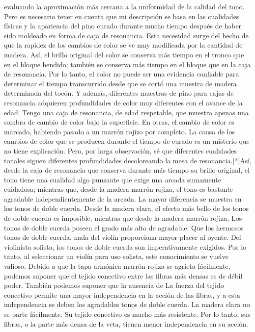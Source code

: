 evaluando la aproximación más cercana a la uniformidad de la calidad del tono. Pero es necesario tener en cuenta que mi descripción se basa en las cualidades físicas y la apariencia del pino curado durante mucho tiempo después de haber sido moldeado en forma de caja de resonancia. Esta necesidad surge del hecho de que la rapidez de los cambios de color se ve muy modificada por la cantidad de madera. Así, el brillo original del color se conserva más tiempo en el tronco que en el bloque hendido; también se conserva más tiempo en el bloque que en la caja de resonancia. Por lo tanto, el color no puede ser una evidencia confiable para determinar el tiempo transcurrido desde que se cortó una muestra de madera determinada del tocón. Y además, diferentes muestras de pino para cajas de resonancia adquieren profundidades de color muy diferentes con el avance de la edad. Tengo una caja de resonancia, de edad respetable, que muestra apenas una sombra de cambio de color bajo la superficie. En otras, el cambio de color es marcado, habiendo pasado a un marrón rojizo por completo. La causa de los cambios de color que se producen durante el tiempo de curado es un misterio que no tiene explicación. Pero, por larga observación, sé que diferentes cualidades tonales siguen diferentes profundidades decoloreando la mesa de resonancia.[*]Así, desde la caja de resonancia que conserva durante más tiempo su brillo original, el tono tiene una cualidad algo punzante que exige una arcada sumamente cuidadosa; mientras que, desde la madera marrón rojiza, el tono es bastante agradable independientemente de la arcada. La mayor diferencia se muestra en los tonos de doble cuerda. Desde la madera clara, el efecto más bello de los tonos de doble cuerda es imposible, mientras que desde la madera marrón rojiza,
Los tonos de doble cuerda poseen el grado más alto de agradable. Que los hermosos tonos de doble cuerda, nada del violín proporciona mayor placer al oyente. Del violinista solista, los tonos de doble cuerda son imperativamente exigidos. Por lo tanto, al seleccionar un violín para uso solista, este conocimiento se vuelve valioso. Debido a que la tapa armónica marrón rojiza se agrieta fácilmente, podemos suponer que el tejido conectivo entre las fibras más densas es de débil
poder. También podemos suponer que la ausencia de
La fuerza del tejido conectivo permite una mayor independencia en la acción de las fibras, y a esta independencia se deben los agradables tonos de doble cuerda. La madera clara no se parte fácilmente. Su tejido conectivo es mucho más resistente. Por lo tanto, sus fibras, o la parte más densa de la veta, tienen menor independencia en su acción.
